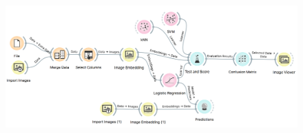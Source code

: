 \begin{figure}[h]
    \centering
    \includegraphics[width=\textwidth]{final-workflow.png}
    \caption{$\;$} %
\end{figure}
